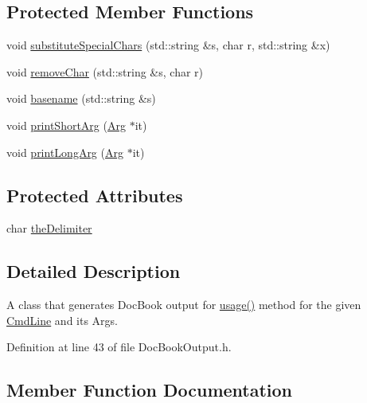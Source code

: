\subsection*{Protected Member Functions}
\begin{DoxyCompactItemize}
\item 
void \hyperlink{class_t_c_l_a_p_1_1_doc_book_output_a7546eaf3a0effeea1030afb27b4c698f}{substitute\+Special\+Chars} (std\+::string \&s, char r, std\+::string \&x)
\item 
void \hyperlink{class_t_c_l_a_p_1_1_doc_book_output_abc059536cb97c49da4e6c5b4a22c6cef}{remove\+Char} (std\+::string \&s, char r)
\item 
void \hyperlink{class_t_c_l_a_p_1_1_doc_book_output_a82d49ab25845c7d191863be9c482409e}{basename} (std\+::string \&s)
\item 
void \hyperlink{class_t_c_l_a_p_1_1_doc_book_output_a980ecacfcda0186a76bb6c37a9c33726}{print\+Short\+Arg} (\hyperlink{class_t_c_l_a_p_1_1_arg}{Arg} $\ast$it)
\item 
void \hyperlink{class_t_c_l_a_p_1_1_doc_book_output_a891cf5ef71592b5261691575c2adad1d}{print\+Long\+Arg} (\hyperlink{class_t_c_l_a_p_1_1_arg}{Arg} $\ast$it)
\end{DoxyCompactItemize}
\subsection*{Protected Attributes}
\begin{DoxyCompactItemize}
\item 
char \hyperlink{class_t_c_l_a_p_1_1_doc_book_output_a081a02a93ce13f694d078c79fe42a7c8}{the\+Delimiter}
\end{DoxyCompactItemize}


\subsection{Detailed Description}
A class that generates Doc\+Book output for \hyperlink{class_t_c_l_a_p_1_1_doc_book_output_adc1ec93f3f7e5e912690be01c5e7d6e2}{usage()} method for the given \hyperlink{class_t_c_l_a_p_1_1_cmd_line}{Cmd\+Line} and its Args. 

Definition at line 43 of file Doc\+Book\+Output.\+h.



\subsection{Member Function Documentation}
\hypertarget{class_t_c_l_a_p_1_1_doc_book_output_a82d49ab25845c7d191863be9c482409e}{}
